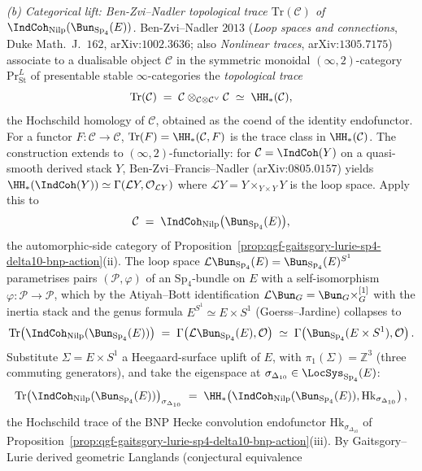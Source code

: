 \begin{proposition}
\emph{(b) Categorical lift: Ben-Zvi--Nadler topological trace $\mathrm{Tr}(\mathcal C)$
of $\IndCoh_{\mathrm{Nilp}}(\Bun_{\mathrm{Sp}_4}(E))$.} Ben-Zvi--Nadler
$2013$ (\emph{Loop spaces and connections}, Duke Math.\ J.\ $162$,
arXiv:$1002.3636$; also \emph{Nonlinear traces}, arXiv:$1305.7175$)
associate to a dualisable object $\mathcal C$ in the symmetric
monoidal $(\infty,2)$-category $\mathrm{Pr}^{L}_{\mathrm{St}}$ of presentable stable
$\infty$-categories the \emph{topological trace}
\[
 \mathrm{Tr}(\mathcal C)
 \;=\;\mathcal C\otimes_{\mathcal C\otimes\mathcal C^{\vee}}\mathcal C
 \;\simeq\;\HH_*(\mathcal C),
\]
the Hochschild homology of $\mathcal C$, obtained as the coend of the
identity endofunctor. For a functor $F\colon\mathcal C\to\mathcal C$,
$\mathrm{Tr}(F)=\HH_*(\mathcal C,F)$ is the trace class in
$\HH_*(\mathcal C)$. The construction extends to
$(\infty,2)$-functorially: for $\mathcal C=\IndCoh(Y)$ on a
quasi-smooth derived stack $Y$, Ben-Zvi--Francis--Nadler
(arXiv:$0805.0157$) yields
$\HH_*(\IndCoh(Y))\simeq\Gamma(\mathcal L Y,\mathcal O_{\mathcal L Y})$
where $\mathcal L Y=Y\times_{Y\times Y}Y$ is the loop space. Apply this
to
\[
 \mathcal C\;=\;\IndCoh_{\mathrm{Nilp}}\bigl(\Bun_{\mathrm{Sp}_4}(E)\bigr),
\]
the automorphic-side category of
Proposition~\ref{prop:qgf-gaitsgory-lurie-sp4-delta10-bnp-action}(ii).
The loop space
$\mathcal L\Bun_{\mathrm{Sp}_4}(E)=\Bun_{\mathrm{Sp}_4}(E)^{S^1}$
parametrises pairs $(\mathcal P,\varphi)$ of an $\mathrm{Sp}_4$-bundle
on $E$ with a self-isomorphism $\varphi\colon\mathcal P\to\mathcal P$,
which by the Atiyah--Bott identification $\mathcal L\Bun_G=\Bun_G\times_G^{[1]}$
with the inertia stack and the genus formula $E^{S^1}\simeq E\times S^1$
(Goerss--Jardine) collapses to
\[
 \mathrm{Tr}\bigl(\IndCoh_{\mathrm{Nilp}}(\Bun_{\mathrm{Sp}_4}(E))\bigr)
 \;=\;\Gamma\!\left(\mathcal L\Bun_{\mathrm{Sp}_4}(E),\mathcal O\right)
 \;\simeq\;\Gamma\!\left(\Bun_{\mathrm{Sp}_4}(E\times S^1),\mathcal O\right).
\]
Substitute $\Sigma=E\times S^1$ a Heegaard-surface uplift of $E$, with
$\pi_1(\Sigma)=\mathbb Z^3$ (three commuting generators), and take the
eigenspace at $\sigma_{\Delta_{10}}\in\LocSys_{\mathrm{Sp}_4}(E)$:
\[
 \mathrm{Tr}\bigl(\IndCoh_{\mathrm{Nilp}}(\Bun_{\mathrm{Sp}_4}(E))\bigr)_{\sigma_{\Delta_{10}}}
 \;=\;\HH_*\!\left(\IndCoh_{\mathrm{Nilp}}(\Bun_{\mathrm{Sp}_4}(E)),\mathrm{Hk}_{\sigma_{\Delta_{10}}}\right),
\]
the Hochschild trace of the BNP Hecke convolution endofunctor
$\mathrm{Hk}_{\sigma_{\Delta_{10}}}$ of
Proposition~\ref{prop:qgf-gaitsgory-lurie-sp4-delta10-bnp-action}(iii).
By Gaitsgory--Lurie derived geometric Langlands (conjectural equivalence

\end{proposition}
